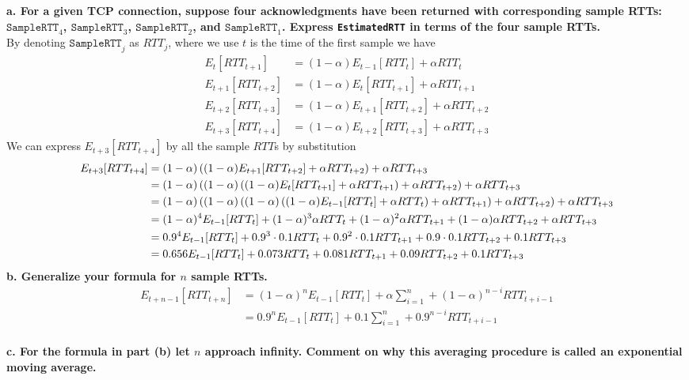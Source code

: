 \textbf{a. For a given TCP connection, suppose four acknowledgments have been returned with corresponding sample RTTs: $\texttt{SampleRTT}_4$, $\texttt{SampleRTT}_3$, $\texttt{SampleRTT}_2$, and $\texttt{SampleRTT}_1$. Express \texttt{EstimatedRTT} in terms of the four sample RTTs.} \\
By denoting $\texttt{SampleRTT}_j$ as $RTT_j$, where we use $t$ is the time of the first sample we have
\begin{equation*}
\begin{split}
    E_t[RTT_{t+1}] &= (1 - \alpha) E_{t-1}[RTT_t] + \alpha RTT_t \\
    E_{t+1}[RTT_{t+2}] &= (1 - \alpha) E_t[RTT_{t+1}] + \alpha RTT_{t+1} \\
    E_{t+2}[RTT_{t+3}] &= (1 - \alpha) E_{t+1}[RTT_{t+2}] + \alpha RTT_{t+2} \\
    E_{t+3}[RTT_{t+4}] &= (1 - \alpha) E_{t+2}[RTT_{t+3}] + \alpha RTT_{t+3}
\end{split}
\end{equation*}
We can express $E_{t+3}[RTT_{t+4}]$ by all the sample $RTT$s by substitution
\begin{equation*}
\begin{split}
    E_{t+3}[RTT_{t+4}] &= (1 - \alpha) \left ((1 - \alpha) E_{t+1}[RTT_{t+2}] + \alpha RTT_{t+2}\right) + \alpha RTT_{t+3} \\
    &= (1 - \alpha) \left ((1 - \alpha) \left ((1 - \alpha) E_t[RTT_{t+1}] + \alpha RTT_{t+1}\right) + \alpha RTT_{t+2}\right) + \alpha RTT_{t+3} \\
    &= (1 - \alpha) \left ((1 - \alpha) \left ((1 - \alpha) \left ((1 - \alpha) E_{t-1}[RTT_t] + \alpha RTT_t\right) + \alpha RTT_{t+1}\right) + \alpha RTT_{t+2}\right) + \alpha RTT_{t+3} \\
    &= (1 - \alpha)^4 E_{t-1}[RTT_t] + (1 - \alpha)^3 \alpha RTT_{t} + (1 - \alpha)^2 \alpha RTT_{t+1} + (1 - \alpha) \alpha RTT_{t+2} + \alpha RTT_{t+3} \\
    &= 0.9^4 E_{t-1}[RTT_t] + 0.9^3 \cdot 0.1 RTT_{t} + 0.9^2 \cdot 0.1 RTT_{t+1} + 0.9 \cdot 0.1 RTT_{t+2} + 0.1 RTT_{t+3} \\
    &=  0.656 E_{t-1}[RTT_t] + 0.073 RTT_{t} + 0.081 RTT_{t+1} + 0.09 RTT_{t+2} + 0.1 RTT_{t+3}
\end{split}
\end{equation*}
\textbf{b. Generalize your formula for $n$ sample RTTs.} \\
\begin{equation*}
\begin{split}
    E_{t+n-1}[RTT_{t+n}] &=  (1 - \alpha)^n E_{t-1}[RTT_t] + \alpha\sum_{i=1}^{n} + (1 - \alpha)^{n-i}  RTT_{t+i-1} \\
    &= 0.9^n E_{t-1}[RTT_t] + 0.1 \sum_{i=1}^{n} + 0.9^{n-i} RTT_{t+i-1} 
\end{split}
\end{equation*}
\\
\textbf{c. For the formula in part (b) let $n$ approach infinity. Comment on why this averaging procedure is called an exponential moving average.}

